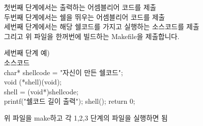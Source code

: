 \documentclass[a4paper, 11pt]{article}
\theoremstyle{definition}
\begin{document}
  첫번째 단계에서는 출력하는 어셈블리어 코드를 제출\\
  두번째 단계에서는 쉘을 뛰우는 어셈블리어 코드를 제출\\
  세번째 단계에서는 해당 쉘코드를 가지고 실행하는 소스코드를 제출\\
   
   그리고 위 파일을 한꺼번에 빌드하는 Makefile을 제출합니다. 

세번째 단계 예)\\

   소스코드\\
	char* shellcode = "자신이 만든 쉘코드";\\
	
	void (*shell)(void);\\

	shell = (void*)shellcode;\\

	printf("쉘코드 길이 출력");
	shell();
	return 0;

  위 파일을 make하고 각 1,2,3 단계의 파일을 실행하면 됨
 
\end{document}
